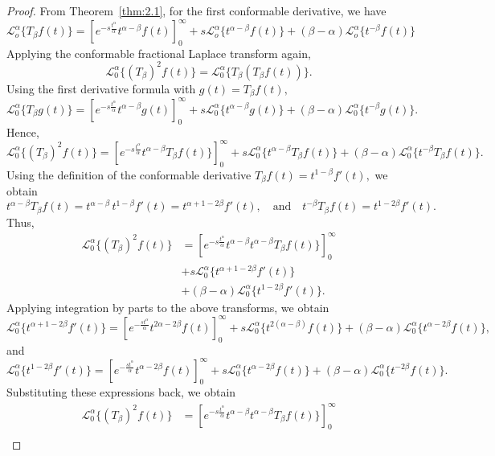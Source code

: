 \documentclass[10pt,a4paper]{amsart}
\begin{document}
\begin{proof}
    From Theorem~\ref{thm:2.1}, for the first conformable derivative, we have
    \[
\mathcal{L}_{o}^{\alpha}\{T_{\beta}f(t)\}
= \left[e^{-s\frac{t^{\alpha}}{\alpha}}t^{\alpha-\beta}f(t)\right]_{0}^{\infty}+
s\mathcal{L}_{o}^{\alpha}\{t^{\alpha-\beta}f(t)\}
+
(\beta-\alpha)\mathcal{L}_{o}^{\alpha}\{t^{-\beta}f(t)\}
\]  
Applying the conformable fractional Laplace transform again,
\[
\mathcal{L}_0^{\alpha}\{(T_{\beta})^{2}f(t)\}
=
\mathcal{L}_0^{\alpha}\{T_{\beta}(T_{\beta}f(t))\}.
\]
Using the first derivative formula with
\(
g(t)=T_{\beta}f(t),
\)
\[
\mathcal{L}_0^{\alpha}\{T_{\beta}g(t)\}
= \left[e^{-s\frac{t^{\alpha}}{\alpha}}t^{\alpha-\beta}g(t)\right]_{0}^{\infty}+
s\mathcal{L}_0^{\alpha}\{t^{\alpha-\beta}g(t)\}
+
(\beta-\alpha)\mathcal{L}_0^{\alpha}\{t^{-\beta}g(t)\}.
\]
Hence,
\[
\mathcal{L}_0^{\alpha}\{(T_{\beta})^{2}f(t)\}
= \left[e^{-s\frac{t^{\alpha}}{\alpha}}t^{\alpha-\beta}T_{\beta}f(t)\}\right]_{0}^{\infty}+
s\mathcal{L}_0^{\alpha}\{t^{\alpha-\beta}T_{\beta}f(t)\}
+
(\beta-\alpha)\mathcal{L}_0^{\alpha}\{t^{-\beta}T_{\beta}f(t)\}.
\]
Using the definition of the conformable derivative
\(
T_{\beta}f(t)=t^{1-\beta}f'(t),
\)
we obtain
\[
t^{\alpha-\beta}T_{\beta}f(t)
=t^{\alpha-\beta}\,t^{1-\beta}f'(t)=t^{\alpha+1-2\beta}f'(t),
\quad\text{and}\quad t^{-\beta}T_{\beta}f(t) = t^{1-2\beta}f'(t).
\]
Thus,
\begin{align*}
\mathcal{L}_0^{\alpha}\{(T_{\beta})^{2}f(t)\}
&= \left[e^{-s\frac{t^{\alpha}}{\alpha}}t^{\alpha-\beta}t^{\alpha-\beta}T_{\beta}f(t)\}\right]_{0}^{\infty}\\
& +
s\mathcal{L}_0^{\alpha}\{t^{\alpha+1-2\beta}f'(t)\}\\
&+
(\beta-\alpha)\mathcal{L}_0^{\alpha}\{t^{1-2\beta}f'(t)\}.
\end{align*}
Applying integration by parts to the above transforms, we obtain
\[
\mathcal{L}_0^{\alpha}\{t^{\alpha+1-2\beta}f'(t)\}
=
\left[e^{-\frac{s t^{\alpha}}{\alpha}} t^{2\alpha-2\beta}f(t)\right]_{0}^{\infty}
+s\mathcal{L}_0^{\alpha}\{t^{2(\alpha-\beta)}f(t)\}
+(\beta-\alpha)\mathcal{L}_0^{\alpha}\{t^{\alpha-2\beta}f(t)\},
\]
and
\[
\mathcal{L}_0^{\alpha}\{t^{1-2\beta}f'(t)\}
=
\left[e^{-\frac{s t^{\alpha}}{\alpha}} t^{\alpha-2\beta}f(t)\right]_{0}^{\infty}
+s\mathcal{L}_0^{\alpha}\{t^{\alpha-2\beta}f(t)\}
+(\beta-\alpha)\mathcal{L}_0^{\alpha}\{t^{-2\beta}f(t)\}.
\]
Substituting these expressions back, we obtain
\begin{align*}
\mathcal{L}_0^{\alpha}\{(T_{\beta})^{2}f(t)\}
&= \left[e^{-s\frac{t^{\alpha}}{\alpha}}t^{\alpha-\beta}t^{\alpha-\beta}T_{\beta}f(t)\}\right]_{0}^{\infty}\\

\end{align*}
\end{proof}
\end{document}
